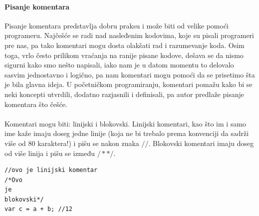 \documentclass[a4paper]{article}
\begin{document}
\paragraph{Pisanje komentara}
Pisanje komentara predstavlja dobru praksu i može biti od velike pomoći programeru. Najčešće se radi nad nasleđenim kodovima, koje su pisali programeri pre nas, pa tako komentari mogu dosta olakšati rad i razumevanje koda. Osim toga, vrlo često prilikom vraćanja na ranije pisane kodove, dešava se da nismo sigurni kako smo nešto napisali, iako nam je u datom momentu to delovalo sasvim jednostavno i logično, pa nam komentari mogu pomoći da se prisetimo šta je bila glavna ideja. U početničkom programiranju, komentari pomažu kako bi se neki koncepti utvrdili, dodatno razjasnili i definisali, pa autor predlaže pisanje komentara što češće.\\\\ 
Komentari mogu biti: linijski i blokovski. Linijski komentari, kao što im i samo ime kaže imaju doseg jedne linije (koja ne bi trebalo prema konvenciji da sadrži više od 80 karaktera!) i pišu se nakon znaka $//$. Blokovski komentari imaju doseg od više linija i pišu se između $/**/$.
\begin{lstlisting}[backgroundcolor = \color{lightgray}]
//ovo je linijski komentar
/*Ovo 
je 
blokovski*/
var c = a + b; //12
\end{lstlisting}
\end{document}
